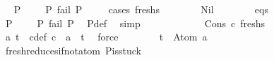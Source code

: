 \begin{isabellebody}
\ \isamarkupfalse%
\ {\isachardoublequoteopen}P\ {\isasymin}\ {\isacharbraceleft}{\kern0pt}{\isacharparenleft}{\kern0pt}{\isacharbrackleft}{\kern0pt}{\isacharbrackright}{\kern0pt}{\isacharcomma}{\kern0pt}\ {\isacharbrackleft}{\kern0pt}{\isacharbrackright}{\kern0pt}{\isacharparenright}{\kern0pt}{\isacharbraceright}{\kern0pt}\ {\isasymunion}\ {\isacharbraceleft}{\kern0pt}P{}{\isachardot}{\kern0pt}\ fail\ P{}{\isacharbraceright}{\kern0pt}{\isachardoublequoteclose}\isanewline
\ \ \ \ \isamarkupfalse%
{\isacharparenleft}{\kern0pt}cases\ freshs{\isacharparenright}{\kern0pt}\isanewline
\ \ \ \ \ \ \isamarkupfalse%
\ Nil\isanewline
\ \ \ \ \ \ \isamarkupfalse%
\ {\isacartoucheopen}eqs\ {\isacharequal}{\kern0pt}\ {\isacharbrackleft}{\kern0pt}{\isacharbrackright}{\kern0pt}{\isacartoucheclose}\isanewline
\ \ \ \ \ \ \isamarkupfalse%
\ {\isachardoublequoteopen}P\ {\isasymin}\ {\isacharbraceleft}{\kern0pt}{\isacharparenleft}{\kern0pt}{\isacharbrackleft}{\kern0pt}{\isacharbrackright}{\kern0pt}{\isacharcomma}{\kern0pt}\ {\isacharbrackleft}{\kern0pt}{\isacharbrackright}{\kern0pt}{\isacharparenright}{\kern0pt}{\isacharbraceright}{\kern0pt}\ {\isasymunion}\ {\isacharbraceleft}{\kern0pt}P{}{\isachardot}{\kern0pt}\ fail\ P{}{\isacharbraceright}{\kern0pt}{\isachardoublequoteclose}\ \isamarkupfalse%
\ P{\isacharunderscore}{\kern0pt}def\ \isamarkupfalse%
\ simp\isanewline
\ \ \ \ \isamarkupfalse%
\isanewline
\ \ \ \ \ \ \isamarkupfalse%
\ {\isacharparenleft}{\kern0pt}Cons\ c\ freshs{\isacharprime}{\kern0pt}{\isacharparenright}{\kern0pt}\isanewline
\ \ \ \ \ \ \isamarkupfalse%
\ \isamarkupfalse%
\ a\ t\ \ c{\isacharunderscore}{\kern0pt}def{\isacharcolon}{\kern0pt}\ {\isachardoublequoteopen}c\ {\isacharequal}{\kern0pt}\ a\ {\isasymsharp}{\isacharquery}{\kern0pt}\ t{\isachardoublequoteclose}\ \isamarkupfalse%
\ force\isanewline
\ \ \ \ \ \ \isamarkupfalse%
\ {\isachardoublequoteopen}t\ {\isacharequal}{\kern0pt}\ Atom\ a{\isachardoublequoteclose}\ \isanewline
\ \ \ \ \ \ \ \ \isamarkupfalse%
\ fresh{\isacharunderscore}{\kern0pt}reduces{\isacharunderscore}{\kern0pt}if{\isacharunderscore}{\kern0pt}not{\isacharunderscore}{\kern0pt}atom\ P{\isacharunderscore}{\kern0pt}is{\isacharunderscore}{\kern0pt}stuck\ \isanewline
\ \ \ \ \ \ \ \ \isamarkupfalse%

\end{isabellebody}
